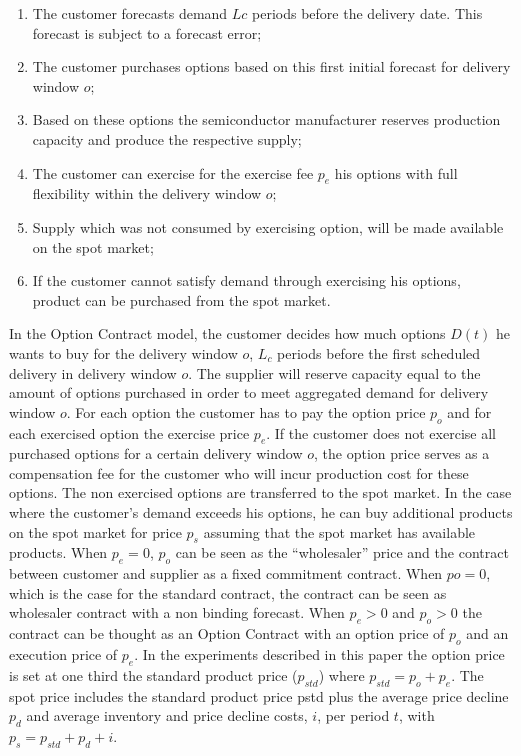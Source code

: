 \documentclass[12pt,english]{article}
\begin{document}
\begin{enumerate}
\item The customer forecasts demand $Lc$ periods before the delivery date.
This forecast is subject to a forecast error;
\item The customer purchases options based on this first initial forecast
for delivery window $o$; 
\item Based on these options the semiconductor manufacturer reserves production
capacity and produce the respective supply; 
\item The customer can exercise for the exercise fee $p_{e}$ his options
with full flexibility within the delivery window $o$; 
\item Supply which was not consumed by exercising option, will be made available
on the spot market; 
\item If the customer cannot satisfy demand through exercising his options,
product can be purchased from the spot market.
\end{enumerate}
In the Option Contract model, the customer decides how much options
$D(t)$ he wants to buy for the delivery window $o$, $L_{c}$ periods
before the first scheduled delivery in delivery window $o$. The supplier
will reserve capacity equal to the amount of options purchased in
order to meet aggregated demand for delivery window $o$. For each
option the customer has to pay the option price $p_{o}$ and for each
exercised option the exercise price $p_{e}$. If the customer does
not exercise all purchased options for a certain delivery window $o$,
the option price serves as a compensation fee for the customer who
will incur production cost for these options. The non exercised options
are transferred to the spot market. In the case where the customer\textquoteright s
demand exceeds his options, he can buy additional products on the
spot market for price $p_{s}$ assuming that the spot market has available
products. When $p_{e}=0$, $p_{o}$ can be seen as the \textquotedblleft wholesaler\textquotedblright{}
price and the contract between customer and supplier as a fixed commitment
contract. When $po=0$, which is the case for the standard contract,
the contract can be seen as wholesaler contract with a non binding
forecast. When $p_{e}>0$ and $p_{o}>0$ the contract can be thought
as an Option Contract with an option price of $p_{o}$ and an execution
price of $p_{e}$. In the experiments described in this paper the
option price is set at one third the standard product price ($p_{std}$)
where $p_{std}=p_{o}+p_{e}$. The spot price includes the standard
product price pstd plus the average price decline $p_{d}$ and average
inventory and price decline costs, $i$, per period $t$, with $p_{s}=p_{std}+p_{d}+i.$
\end{document}
